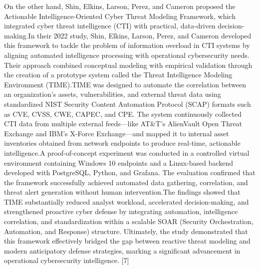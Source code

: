 \documentclass[12pt,a4paper]{report}
\begin{document}
On the other hand, Shin, Elkins, Larson, Perez, and Cameron proposed the Actionable Intelligence-Oriented Cyber Threat Modeling Framework, which integrated cyber threat intelligence (CTI) with practical, data-driven decision-making.In their 2022 study, Shin, Elkins, Larson, Perez, and Cameron developed this framework to tackle the problem of information overload in CTI systems by aligning automated intelligence processing with operational cybersecurity needs. Their approach combined conceptual modeling with empirical validation through the creation of a prototype system called the Threat Intelligence Modeling Environment (TIME).TIME was designed to automate the correlation between an organization’s assets, vulnerabilities, and external threat data using standardized NIST Security Content Automation Protocol (SCAP) formats such as CVE, CVSS, CWE, CAPEC, and CPE. The system continuously collected CTI data from multiple external feeds—like AT\&T’s AlienVault Open Threat Exchange and IBM’s X-Force Exchange—and mapped it to internal asset inventories obtained from network endpoints to produce real-time, actionable intelligence.A proof-of-concept experiment was conducted in a controlled virtual environment containing Windows 10 endpoints and a Linux-based backend developed with PostgreSQL, Python, and Grafana. The evaluation confirmed that the framework successfully achieved automated data gathering, correlation, and threat alert generation without human intervention.The findings showed that TIME substantially reduced analyst workload, accelerated decision-making, and strengthened proactive cyber defense by integrating automation, intelligence correlation, and standardization within a scalable SOAR (Security Orchestration, Automation, and Response) structure. Ultimately, the study demonstrated that this framework effectively bridged the gap between reactive threat modeling and modern anticipatory defense strategies, marking a significant advancement in operational cybersecurity intelligence. [7]
\end{document}
